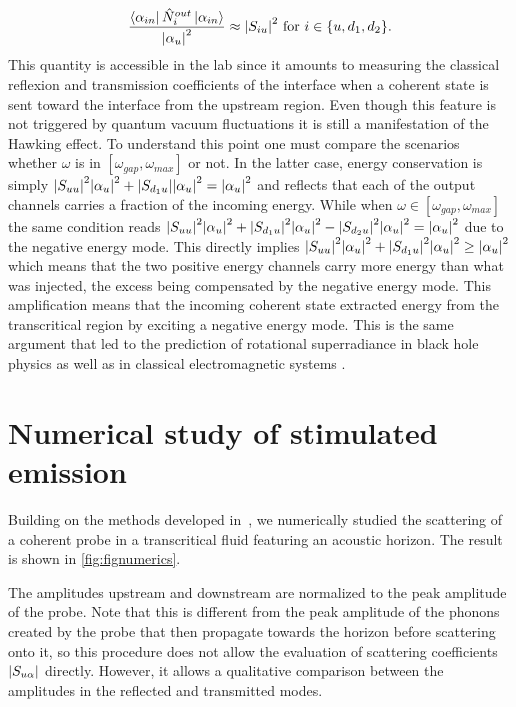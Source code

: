 \begin{equation}
    \dfrac{\bra{\alpha_{in}}\hat{N}_i^{out}\ket{\alpha_{in}}}{\abs{\alpha_u}^2} \approx \abs{S_{i u}}^2 \ \mathrm{for} \ i\in\{u,d_1,d_2\}.
\end{equation}
This quantity is accessible in the lab since it amounts to measuring the classical reflexion and transmission coefficients of the interface when a
coherent state is sent toward the interface from the upstream region. Even though this feature is not triggered by quantum vacuum 
fluctuations it is still a manifestation of the Hawking effect. To understand this point one must compare the scenarios
whether $\omega$ is in $[\omega_{gap}, \omega_{max}]$ or not. In the latter case, energy conservation is simply $\abs{S_{uu}}^2\abs{\alpha_u}^2+\abs{S_{d_1u}}\abs{\alpha_u}^2=\abs{\alpha_u}^2$ and reflects that each of the output channels
carries a fraction of the incoming energy. While when $\omega \in [\omega_{gap}, \omega_{max}]$ the same condition reads $\abs{S_{uu}}^2\abs{\alpha_u}^2+\abs{S_{d_1u}}^2\abs{\alpha_u}^2-\abs{S_{d_2u}}^2\abs{\alpha_u}^2=\abs{\alpha_u}^2$ due to the negative energy mode.
This directly implies $\abs{S_{uu}}^2\abs{\alpha_u}^2+\abs{S_{d_1u}}^2\abs{\alpha_u}^2\geq \abs{\alpha_u}^2$ which means that the two positive energy channels
carry more energy than what was injected, the excess being compensated by the negative energy mode. This amplification means that the incoming 
coherent state extracted energy from the transcritical region by exciting a negative energy mode. This is the same 
argument that led to the prediction of rotational superradiance in black hole physics \cite{hawking_black_1972} as well as in classical electromagnetic systems \cite{zeldovich__1970}.


\section{Numerical study of stimulated emission}
Building on the methods developed in~\cite{jacquet_quantum_2023}, we numerically studied the scattering of a coherent probe in a transcritical fluid featuring an acoustic horizon.
The result is shown in \autoref{fig:fignumerics}.

The amplitudes upstream and downstream are normalized to the peak amplitude of the probe.
Note that this is different from the peak amplitude of the phonons created by the probe that then propagate towards the horizon before scattering onto it, so this procedure does not allow the evaluation of scattering coefficients $\abs{S_{u\alpha}}$ directly.
However, it allows a qualitative comparison between the amplitudes in the reflected and transmitted modes.

